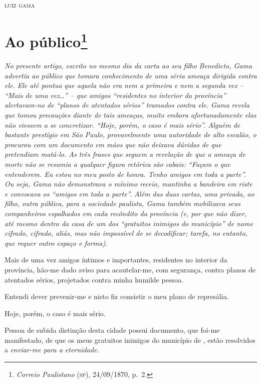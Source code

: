 {\begin{flushright}
\textsc{luiz gama}
\end{flushright}


\chapter{Ao público\footnote{\emph{Correio Paulistano} (\textsc{sp}), 24/09/1870, p.~2.}} %


\begin{didascalia}
\emph{No presente artigo, escrito no mesmo dia da carta ao seu filho
Benedicto, Gama advertia ao público que tomara conhecimento de uma séria
ameaça dirigida contra ele. Ele até pontua que aquela não era nem a
primeira e nem a segunda vez -- ``Mais de uma vez\ldots{}'' -- que amigos
``residentes no interior da província'' alertavam-no de ``planos de
atentados sérios'' tramados contra ele. Gama revela que tomou precauções
diante de tais ameaças, muito embora afortunadamente elas não viessem a
se concretizar. ``Hoje, porém, o caso é mais sério''. Alguém de bastante
prestígio em São Paulo, provavelmente uma autoridade de alto escalão, o
procurou com um documento em mãos que não deixava dúvidas de que
pretendiam matá-lo. As três frases que seguem a revelação de que a
ameaça de morte não se resumia a qualquer figura retórica são cabais:
``Façam o que entenderem. Eu estou no meu posto de honra. Tenho amigos em
toda a parte''. Ou seja, Gama não demonstrava o mínimo receio, mantinha a
bandeira em riste e convocava os ``amigos em toda a parte''. Além das duas
cartas, uma privada, ao filho, outra pública, para a sociedade paulista,
Gama também mobilizava seus companheiros espalhados em cada recôndito da
província (e, por que não dizer, até mesmo dentro da casa de um dos
``gratuitos inimigos do município'' de nome cifrado, cifrado, aliás, mas
não impossível de se decodificar; tarefa, no entanto, que requer outro
espaço e forma).}
\end{didascalia}


Mais de uma vez amigos íntimos e importantes, residentes no interior da
província, hão-me dado aviso para acautelar-me, com segurança, contra
planos de atentados sérios, projetados contra minha humilde pessoa.

Entendi dever prevenir-me e nisto fiz consistir o meu plano de
represália.

Hoje, porém, o caso é mais sério.

Pessoa de subida distinção desta cidade possui documento, que foi-me
manifestado, de que os meus gratuitos inimigos do município de \asterisc{},
estão resolvidos a \emph{enviar-me para a eternidade}.

}
